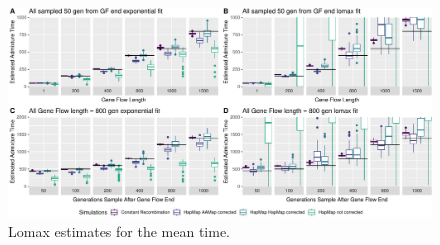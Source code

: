 \documentclass[]{article}
\begin{document}
\begin{figure}
\centering
\includegraphics{Admixture_Time_Inference_Paper_Draft_files/figure-latex/figS2-1.pdf}
\caption{\label{fig:figS2} Lomax estimates for the mean time.}
\end{figure}
\end{document}
